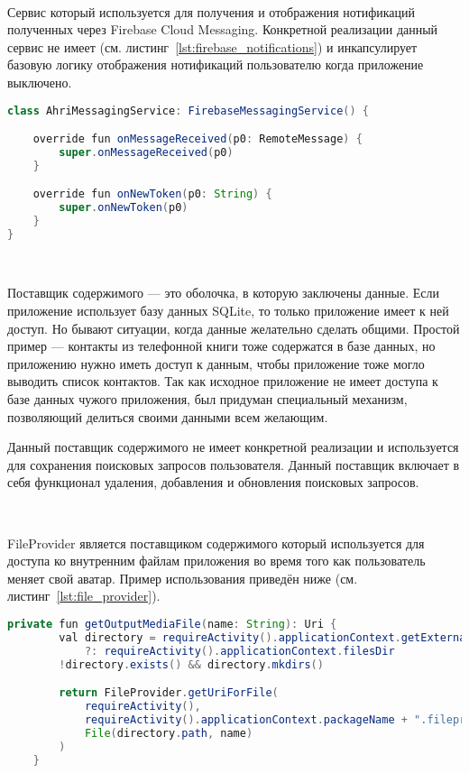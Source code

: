 ~\par

Сервис который используется для получения и отображения нотификаций полученных через Firebase Cloud Messaging. Конкретной реализации данный сервис не имеет (см. листинг~\ref{lst:firebase_notifications}) и инкапсулирует базовую логику отображения нотификаций пользователю когда приложение выключено.

\begin{lstlisting}[language=Java,label={lst:firebase_notifications},caption={AhriMessagingService}]
class AhriMessagingService: FirebaseMessagingService() {

    override fun onMessageReceived(p0: RemoteMessage) {
        super.onMessageReceived(p0)
    }

    override fun onNewToken(p0: String) {
        super.onNewToken(p0)
    }
}
\end{lstlisting}

~\par
Поставщик содержимого — это оболочка, в которую заключены данные. Если приложение использует базу данных SQLite, то только приложение имеет к ней доступ. Но бывают ситуации, когда данные желательно сделать общими. Простой пример — контакты из телефонной книги тоже содержатся в базе данных, но приложению нужно иметь доступ к данным, чтобы приложение тоже могло выводить список контактов. Так как исходное приложение не имеет доступа к базе данных чужого приложения, был придуман специальный механизм, позволяющий делиться своими данными всем желающим.

Данный поставщик содержимого не имеет конкретной реализации и используется для сохранения поисковых запросов пользователя. Данный поставщик включает в себя функционал удаления, добавления и обновления поисковых запросов.

~\par
FileProvider является поставщиком содержимого который используется для доступа ко внутренним файлам приложения во время того как пользователь меняет свой аватар. Пример использования приведён ниже (см. листинг~\ref{lst:file_provider}).

\begin{lstlisting}[language=Java,label={lst:file_provider},caption={Использование FileProvider}]
    private fun getOutputMediaFile(name: String): Uri {
        val directory = requireActivity().applicationContext.getExternalFilesDir(null)
            ?: requireActivity().applicationContext.filesDir
        !directory.exists() && directory.mkdirs()

        return FileProvider.getUriForFile(
            requireActivity(),
            requireActivity().applicationContext.packageName + ".fileprovider",
            File(directory.path, name)
        )
    }
\end{lstlisting}

